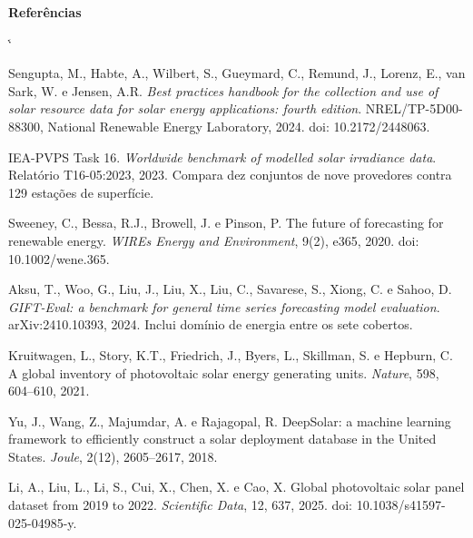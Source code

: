 \documentclass[10pt,a4paper,oneside]{book}
\makeatletter
\renewenvironment{thebibliography}[1]
  {\list{\@biblabel{\@arabic\c@enumiv}}%
     {\settowidth\labelwidth{\@biblabel{#1}}%
      \leftmargin\labelwidth \advance\leftmargin\labelsep
      \usecounter{enumiv}\let\p@enumiv\@empty
      \renewcommand\theenumiv{\@arabic\c@enumiv}}%
   \sloppy\clubpenalty4000 \@clubpenalty\clubpenalty
   \widowpenalty4000 \sfcode`\.\@m}
  {\endlist}
\makeatother
\begin{document}
\begin{landscape}
\vspace{1.4em}
{\sffamily\bfseries\large Referências\par}
\vspace{0.3em}
{\sffamily\fontsize{6.8}{8.6}\selectfont\color{tinta2}
\begin{thebibliography}{99}
\setlength{\itemsep}{0.15em}

 Sengupta, M., Habte, A., Wilbert, S., Gueymard, C.,
  Remund, J., Lorenz, E., van Sark, W. e Jensen, A.R. \emph{Best practices
  handbook for the collection and use of solar resource data for solar energy
  applications: fourth edition}. NREL/TP-5D00-88300, National Renewable Energy
  Laboratory, 2024. doi: 10.2172/2448063.

 IEA-PVPS Task 16. \emph{Worldwide benchmark of modelled
  solar irradiance data}. Relatório T16-05:2023, 2023. Compara dez conjuntos de
  nove provedores contra 129 estações de superfície.

 Sweeney, C., Bessa, R.J., Browell, J. e Pinson, P. The
  future of forecasting for renewable energy. \emph{WIREs Energy and
  Environment}, 9(2), e365, 2020. doi: 10.1002/wene.365.

 Aksu, T., Woo, G., Liu, J., Liu, X., Liu, C., Savarese, S.,
  Xiong, C. e Sahoo, D. \emph{GIFT-Eval: a benchmark for general time series
  forecasting model evaluation}. arXiv:2410.10393, 2024. Inclui domínio de
  energia entre os sete cobertos.

 Kruitwagen, L., Story, K.T., Friedrich, J., Byers, L.,
  Skillman, S. e Hepburn, C. A global inventory of photovoltaic solar energy
  generating units. \emph{Nature}, 598, 604--610, 2021.

 Yu, J., Wang, Z., Majumdar, A. e Rajagopal, R. DeepSolar: a
  machine learning framework to efficiently construct a solar deployment
  database in the United States. \emph{Joule}, 2(12), 2605--2617, 2018.

 Li, A., Liu, L., Li, S., Cui, X., Chen, X. e Cao, X.
  Global photovoltaic solar panel dataset from 2019 to 2022.
  \emph{Scientific Data}, 12, 637, 2025.
  doi: 10.1038/s41597-025-04985-y.


\end{thebibliography}}
\end{landscape}
\end{document}
